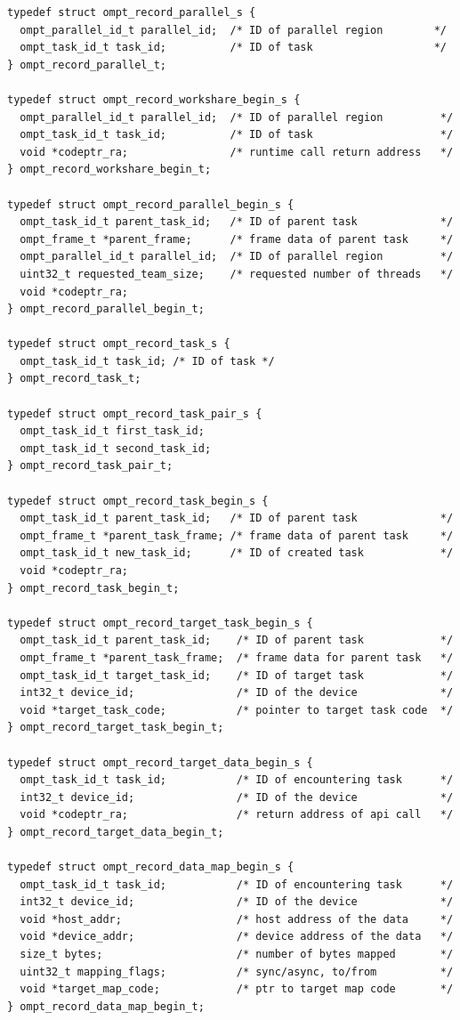 \documentclass{article}
\begin{document}
{\begin{verbatim}
typedef struct ompt_record_parallel_s {
  ompt_parallel_id_t parallel_id;  /* ID of parallel region        */
  ompt_task_id_t task_id;          /* ID of task                   */
} ompt_record_parallel_t;

typedef struct ompt_record_workshare_begin_s {
  ompt_parallel_id_t parallel_id;  /* ID of parallel region         */
  ompt_task_id_t task_id;          /* ID of task                    */
  void *codeptr_ra;                /* runtime call return address   */
} ompt_record_workshare_begin_t;

typedef struct ompt_record_parallel_begin_s {
  ompt_task_id_t parent_task_id;   /* ID of parent task             */
  ompt_frame_t *parent_frame;      /* frame data of parent task     */
  ompt_parallel_id_t parallel_id;  /* ID of parallel region         */
  uint32_t requested_team_size;    /* requested number of threads   */
  void *codeptr_ra;             
} ompt_record_parallel_begin_t;

typedef struct ompt_record_task_s {
  ompt_task_id_t task_id; /* ID of task */
} ompt_record_task_t;

typedef struct ompt_record_task_pair_s {
  ompt_task_id_t first_task_id; 
  ompt_task_id_t second_task_id;  
} ompt_record_task_pair_t;

typedef struct ompt_record_task_begin_s {
  ompt_task_id_t parent_task_id;   /* ID of parent task             */
  ompt_frame_t *parent_task_frame; /* frame data of parent task     */
  ompt_task_id_t new_task_id;      /* ID of created task            */
  void *codeptr_ra;               
} ompt_record_task_begin_t;

typedef struct ompt_record_target_task_begin_s {
  ompt_task_id_t parent_task_id;    /* ID of parent task            */
  ompt_frame_t *parent_task_frame;  /* frame data for parent task   */
  ompt_task_id_t target_task_id;    /* ID of target task            */
  int32_t device_id;                /* ID of the device             */
  void *target_task_code;           /* pointer to target task code  */
} ompt_record_target_task_begin_t;

typedef struct ompt_record_target_data_begin_s {
  ompt_task_id_t task_id;           /* ID of encountering task      */
  int32_t device_id;                /* ID of the device             */
  void *codeptr_ra;                 /* return address of api call   */
} ompt_record_target_data_begin_t;
 
typedef struct ompt_record_data_map_begin_s {
  ompt_task_id_t task_id;           /* ID of encountering task      */
  int32_t device_id;                /* ID of the device             */
  void *host_addr;                  /* host address of the data     */
  void *device_addr;                /* device address of the data   */ 
  size_t bytes;                     /* number of bytes mapped       */
  uint32_t mapping_flags;           /* sync/async, to/from          */
  void *target_map_code;            /* ptr to target map code       */
} ompt_record_data_map_begin_t;


\end{verbatim}}
\end{document}
